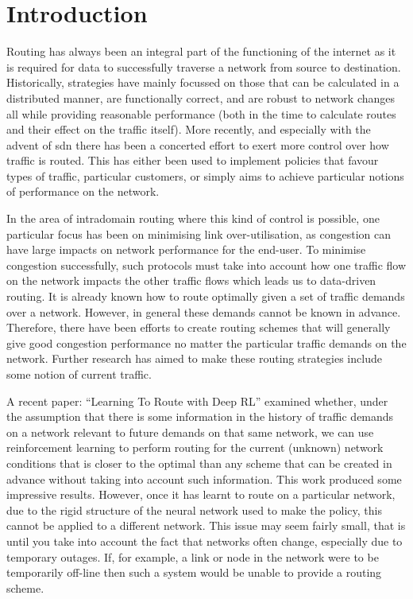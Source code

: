 \chapter{Introduction}

\setcounter{page}{1}

Routing has always been an integral part of the functioning of the internet as it is required for data to successfully traverse a network from source to destination. Historically, strategies have mainly focussed on those that can be calculated in a distributed manner, are functionally correct, and are robust to network changes all while providing reasonable performance (both in the time to calculate routes and their effect on the traffic itself). More recently, and especially with the advent of \ac{sdn} there has been a concerted effort to exert more control over how traffic is routed. This has either been used to implement policies that favour types of traffic, particular customers, or simply aims to achieve particular notions of performance on the network.

In the area of intradomain routing where this kind of control is possible, one particular focus has been on minimising link over-utilisation, as congestion can have large impacts on network performance for the end-user. To minimise congestion successfully, such protocols must take into account how one traffic flow on the network impacts the other traffic flows which leads us to data-driven routing. It is already known how to route optimally given a set of traffic demands over a network. However, in general these demands cannot be known in advance. Therefore, there have been efforts to create routing schemes that will generally give good congestion performance no matter the particular traffic demands on the network. Further research has aimed to make these routing strategies include some notion of current traffic.

A recent paper: ``Learning To Route with Deep RL''\cite{valadarsky2017learning} examined whether, under the assumption that there is some information in the history of traffic demands on a network relevant to future demands on that same network, we can use reinforcement learning to perform routing for the current (unknown) network conditions that is closer to the optimal than any scheme that can be created in advance without taking into account such information. This work produced some impressive results. However, once it has learnt to route on a particular network, due to the rigid structure of the neural network used to make the policy, this cannot be applied to a different network. This issue may seem fairly small, that is until you take into account the fact that networks often change, especially due to temporary outages. If, for example, a link or node in the network were to be temporarily off-line then such a system would be unable to provide a routing scheme.

